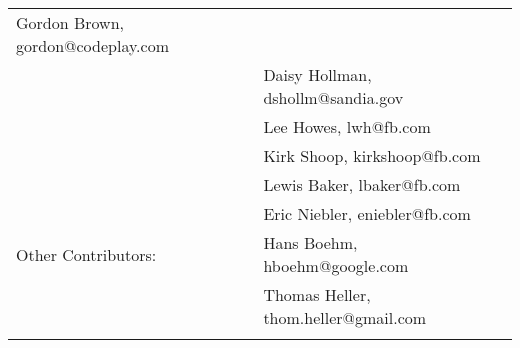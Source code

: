 \documentclass[a4paper,12pt,notitlepage,twoside,openright]{article}
\begin{document}
\begin{longtable}[]{@{}ll@{}}
\begin{minipage}[t]{0.50\columnwidth}
Gordon Brown, gordon@codeplay.com\strut
\end{minipage}\tabularnewline
\begin{minipage}[t]{0.26\columnwidth}\raggedright
\strut
\end{minipage} & \begin{minipage}[t]{0.50\columnwidth}\raggedright
Daisy Hollman, dshollm@sandia.gov\strut
\end{minipage}\tabularnewline
\begin{minipage}[t]{0.26\columnwidth}\raggedright
\strut
\end{minipage} & \begin{minipage}[t]{0.50\columnwidth}\raggedright
Lee Howes, lwh@fb.com\strut
\end{minipage}\tabularnewline
\begin{minipage}[t]{0.26\columnwidth}\raggedright
\strut
\end{minipage} & \begin{minipage}[t]{0.50\columnwidth}\raggedright
Kirk Shoop, kirkshoop@fb.com\strut
\end{minipage}\tabularnewline
\begin{minipage}[t]{0.26\columnwidth}\raggedright
\strut
\end{minipage} & \begin{minipage}[t]{0.50\columnwidth}\raggedright
Lewis Baker, lbaker@fb.com\strut
\end{minipage}\tabularnewline
\begin{minipage}[t]{0.26\columnwidth}\raggedright
\strut
\end{minipage} & \begin{minipage}[t]{0.50\columnwidth}\raggedright
Eric Niebler, eniebler@fb.com\strut
\end{minipage}\tabularnewline
\begin{minipage}[t]{0.26\columnwidth}\raggedright
Other Contributors:\strut
\end{minipage} & \begin{minipage}[t]{0.50\columnwidth}\raggedright
Hans Boehm, hboehm@google.com\strut
\end{minipage}\tabularnewline
\begin{minipage}[t]{0.26\columnwidth}\raggedright
\strut
\end{minipage} & \begin{minipage}[t]{0.50\columnwidth}\raggedright
Thomas Heller, thom.heller@gmail.com\strut
\end{minipage}\tabularnewline
\begin{minipage}[t]{0.26\columnwidth}\raggedright

\end{minipage}
\end{longtable}
\end{document}
